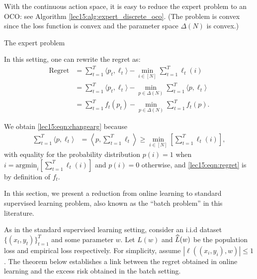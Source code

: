 With the continuous action space, it is easy to reduce the expert problem to an OCO: see Algorithm \ref{lec15:alg:expert_discrete_oco}. (The problem is convex since the loss function is convex and the parameter space $\Delta(N)$ is convex.)

\begin{algorithm}[h]
\caption{The expert problem}
\label{lec15:alg:expert_discrete_oco}
\end{algorithm}

In this setting, one can rewrite the regret as:
\begin{align}
\text{Regret} &= \sum_{t=1}^T \langle p_t, \ell_t \rangle - \min_{i\in[N]}\sum_{t=1}^T \ell_t(i)  \\
&= \sum_{t=1}^T \langle p_t, \ell_t \rangle - \min_{p \in \Delta(N)}\sum_{t=1}^T \langle p, \ell_t \rangle \label{lec15:eqn:changearg} \\
&= \sum_{t=1}^T f_t(p_t) - \min_{p \in \Delta(N)}\sum_{t=1}^T f_t(p). \label{lec15:eqn:regret}
\end{align}

We obtain \eqref{lec15:eqn:changearg} because
\begin{align}
\sum_{t=1}^T \langle p, \ell_t \rangle &=  \left\langle p,  \sum_{t=1}^T\ell_t \right\rangle \geq \min_{i \in [N]} \left[ \sum_{t=1}^T \ell_t (i) \right],
\end{align}
with equality for the probability distribution $p(i) =1$ when $i = \text{argmin}_i \left[ \sum_{t=1}^T \ell_t (i) \right]$ and $p(i) = 0$ otherwise, and \eqref{lec15:eqn:regret} is by definition of $f_t$.


In this section, we present a reduction from online learning to standard supervised learning problem, also known as the ``batch problem'' in this literature.

As in the standard supervised learning setting, consider an i.i.d dataset $\{(x_t, y_t)\}_{t=1}^T$ and some parameter $w$. Let $L(w)$ and $\widehat{L}(w)$ be the population loss and empirical loss respectively. For simplicity, assume $|\ell((x_i, y_i), w)| \leq 1$. The theorem below establishes a link between the regret obtained in online learning and the excess risk obtained in the batch setting.
    
